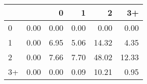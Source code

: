 \begin{tabular}{lrrrrr}
\hline
    &      &    0 &    1 &     2 &    3+ \\
\hline
 0  & 0.00 & 0.00 & 0.00 &  0.00 &  0.00 \\
 1  & 0.00 & 6.95 & 5.06 & 14.32 &  4.35 \\
 2  & 0.00 & 7.66 & 7.70 & 48.02 & 12.33 \\
 3+ & 0.00 & 0.00 & 0.09 & 10.21 &  0.95 \\
\hline
\end{tabular}